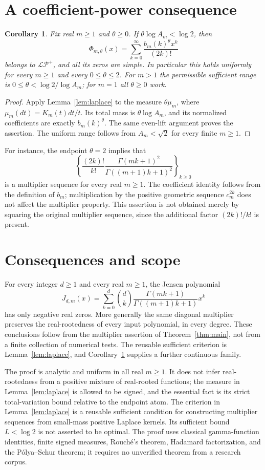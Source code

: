\documentclass[11pt,a4paper]{article}
\newtheorem{corollary}[theorem]{Corollary}
\newcommand{\LP}{\mathcal{LP}^{+}}
\begin{document}
\section{A coefficient-power consequence}
\begin{corollary}\label{cor:powers}
Fix real $m\ge1$ and $\theta\ge0$. If
$\theta\log A_m<\log2$, then
\[
\Phi_{m,\theta}(x)=\sum_{k=0}^{\infty}
\frac{b_m(k)^\theta x^k}{(2k)!}
\]
belongs to $\LP$, and all its zeros are simple. In particular this holds
uniformly for every $m\ge1$ and every $0\le\theta\le2$.
For $m>1$ the permissible sufficient range is
$0\le\theta<\log2/\log A_m$; for $m=1$ all $\theta\ge0$ work.
\end{corollary}
\begin{proof}
Apply Lemma~\ref{lem:laplace} to the measure $\theta\mu_m$, where
$\mu_m(dt)=K_m(t)dt/t$. Its total mass is $\theta\log A_m$,
and its normalized coefficients are exactly $b_m(k)^\theta$.
The same even-lift argument proves the assertion. The uniform range follows
from $A_m<\sqrt2$ for every finite $m\ge1$.
\end{proof}
For instance, the endpoint $\theta=2$ implies that
\[
\left\{\frac{(2k)!}{k!}
\frac{\Gamma(mk+1)^2}{\Gamma((m+1)k+1)^2}\right\}_{k\ge0}
\]
is a multiplier sequence for every real $m\ge1$. The coefficient identity follows from the definition of $b_m$;
multiplication by the positive geometric sequence $c_m^{2k}$
does not affect the multiplier property.
This assertion is not obtained merely by squaring the original multiplier
sequence, since the additional factor $(2k)!/k!$ is present.

\section{Consequences and scope}
For every integer $d\ge1$ and every real $m\ge1$, the Jensen polynomial
\[
 J_{d,m}(x)=\sum_{k=0}^d\binom dk
 \frac{\Gamma(mk+1)}{\Gamma((m+1)k+1)}x^k
\]
has only negative real zeros. More generally the same diagonal multiplier
preserves the real-rootedness of every input polynomial, in every degree.
These conclusions follow from the multiplier assertion of
Theorem~\ref{thm:main}, not from a finite collection of numerical tests.
The reusable sufficient criterion is Lemma~\ref{lem:laplace}, and
Corollary~\ref{cor:powers} supplies a further continuous family.

The proof is analytic and uniform in all real $m\ge1$. It does not infer
real-rootedness from a positive mixture of real-rooted functions; the measure
in Lemma~\ref{lem:laplace} is allowed to be signed, and the essential fact
is its strict total-variation bound relative to the endpoint atom.
The criterion in Lemma~\ref{lem:laplace} is a reusable sufficient condition
for constructing multiplier sequences from small-mass positive Laplace
kernels. Its sufficient bound $L<\log2$ is not asserted to be optimal.
The proof uses classical gamma-function identities, finite signed measures,
Rouch\'e's theorem, Hadamard factorization, and the P\'olya--Schur theorem;
it requires no unverified theorem from a research corpus.
\end{document}
